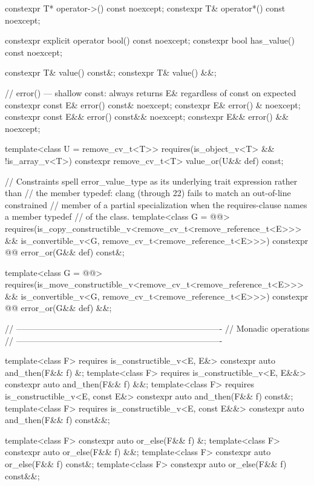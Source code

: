 \begin{codeblock}
{  constexpr T* operator->() const noexcept;
  constexpr T& operator*() const noexcept;

  constexpr explicit operator bool() const noexcept;
  constexpr bool has_value() const noexcept;

  constexpr T& value() const&;
  constexpr T& value() &&;

  // error() — shallow const: always returns E& regardless of const on expected
  constexpr const E& error() const& noexcept;
  constexpr E& error() & noexcept;
  constexpr const E&& error() const&& noexcept;
  constexpr E&& error() && noexcept;

  template<class U = remove_cv_t<T>>
    requires(is_object_v<T> && !is_array_v<T>)
  constexpr remove_cv_t<T> value_or(U&& def) const;

  // Constraints spell error_value_type as its underlying trait expression rather than
  // the member typedef: clang (through 22) fails to match an out-of-line constrained
  // member of a partial specialization when the requires-clause names a member typedef
  // of the class.
  template<class G = @@>
    requires(is_copy_constructible_v<remove_cv_t<remove_reference_t<E>>> &&
             is_convertible_v<G, remove_cv_t<remove_reference_t<E>>>)
  constexpr @@ error_or(G&& def) const&;

  template<class G = @@>
    requires(is_move_constructible_v<remove_cv_t<remove_reference_t<E>>> &&
             is_convertible_v<G, remove_cv_t<remove_reference_t<E>>>)
  constexpr @@ error_or(G&& def) &&;

  // -------------------------------------------------------------------------
  // Monadic operations
  // -------------------------------------------------------------------------

  template<class F>
    requires is_constructible_v<E, E&>
  constexpr auto and_then(F&& f) &;
  template<class F>
    requires is_constructible_v<E, E&&>
  constexpr auto and_then(F&& f) &&;
  template<class F>
    requires is_constructible_v<E, const E&>
  constexpr auto and_then(F&& f) const&;
  template<class F>
    requires is_constructible_v<E, const E&&>
  constexpr auto and_then(F&& f) const&&;

  template<class F> constexpr auto or_else(F&& f) &;
  template<class F> constexpr auto or_else(F&& f) &&;
  template<class F> constexpr auto or_else(F&& f) const&;
  template<class F> constexpr auto or_else(F&& f) const&&;

}
\end{codeblock}
